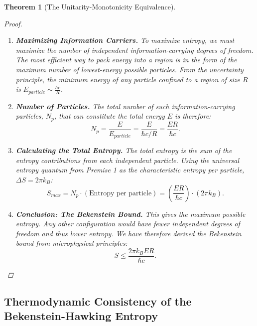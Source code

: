 \documentclass[11pt, letterpaper]{report}
\theoremstyle{plain} %
\newtheorem{theorem}{Theorem}[chapter]
\theoremstyle{definition} %
\theoremstyle{remark} %
\begin{document}
\begin{theorem}[The Unitarity-Monotonicity Equivalence]
\begin{proof}
\begin{enumerate}
    \item \textbf{Maximizing Information Carriers.} To maximize entropy, we must maximize the number of independent information-carrying degrees of freedom. The most efficient way to pack energy into a region is in the form of the maximum number of lowest-energy possible particles. From the uncertainty principle, the minimum energy of any particle confined to a region of size $R$ is $E_{particle} \sim \frac{\hbar c}{R}$.

    \item \textbf{Number of Particles.} The total number of such information-carrying particles, $N_p$, that can constitute the total energy $E$ is therefore:
    \begin{equation}
        N_p = \frac{E}{E_{particle}} = \frac{E}{\hbar c / R} = \frac{ER}{\hbar c}.
    \end{equation}

    \item \textbf{Calculating the Total Entropy.} The total entropy is the sum of the entropy contributions from each independent particle. Using the universal entropy quantum from Premise 1 as the characteristic entropy per particle, $\Delta S = 2\pi k_B$:
    \begin{equation}
        S_{max} = N_p \cdot (\text{Entropy per particle}) = \left( \frac{ER}{\hbar c} \right) \cdot (2\pi k_B).
    \end{equation}

    \item \textbf{Conclusion: The Bekenstein Bound.} This gives the maximum possible entropy. Any other configuration would have fewer independent degrees of freedom and thus lower entropy. We have therefore derived the Bekenstein bound from microphysical principles:
    \begin{equation}
        S \le \frac{2\pi k_B E R}{\hbar c}.
    \end{equation}
\end{enumerate}
\end{proof}

\subsection{Thermodynamic Consistency of the Bekenstein-Hawking Entropy}
\label{subsec:verify_bekenstein_hawking}


\end{theorem}
\end{document}
